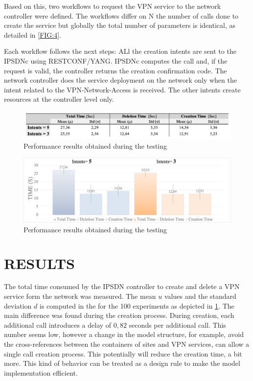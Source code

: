 \documentclass[conference]{IEEEtran}
\begin{document}
Based on this, two workflows to request the VPN service to the network controller were defined. The workflows differ on N the number of calls done to create the service but globally the total number of parameters is identical, as detailed in \cref{FIG:4}.

Each workflow follows the next steps:  ALl the creation intents are sent to the IPSDNc using RESTCONF/YANG. IPSDNc computes the call and, if the request is valid, the controller returns the creation confirmation code. The network controller does the service deployment on the network only when the intent related to the VPN-Network-Access is received. The other intents create resources at the controller level only.

\begin{figure}
	\centering
		\includegraphics[width=\linewidth]{figure51.png}
	\caption{Performance results obtained during the testing}
	\label{FIG:5}
\end{figure}

\begin{figure}
	\centering
		\includegraphics[width=\linewidth]{figure62.png}
	\caption{Performance results obtained during the testing}
	\label{FIG:6}
\end{figure}

\section{RESULTS}
\label{sect:resul}

The total time consumed by the IPSDN controller to create and delete a VPN service form the network was measured. The mean $u$ values and the standard deviation $d$ is computed in the for the 100 experiments as depicted in \cref{FIG:5}. The main difference was found during the creation process. During creation, each additional call introduces a delay of $0,82$ seconds per additional call. This number seems low, however a change in the model structure, for example, avoid the cross-references between the containers of sites and VPN services, can allow a single call creation process. This potentially will reduce the creation time, a bit more. This kind of behavior can be treated as a design rule to make the model implementation efficient. 
\end{document}
